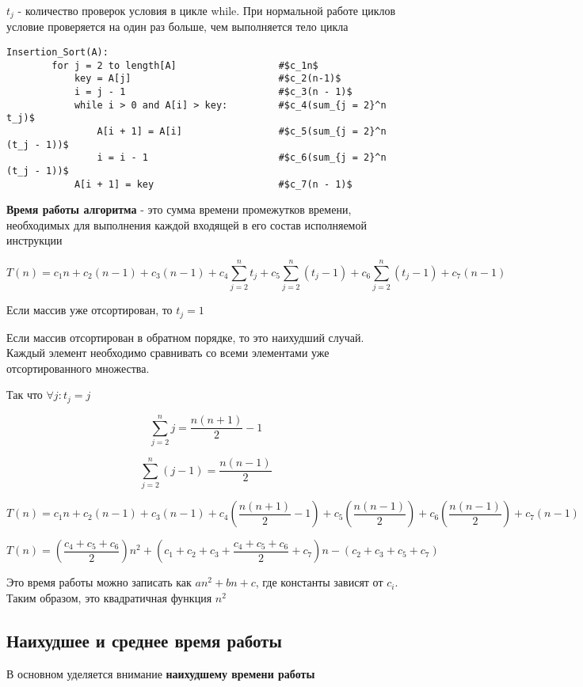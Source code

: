 \documentclass[a4paper, 12pt]{article}
\begin{document}
$t_j$ - количество проверок условия в цикле while. При нормальной работе циклов условие проверяется на один раз больше, чем 
выполняется тело цикла

\begin{lstlisting}[mathescape = true]
    Insertion_Sort(A):
        for j = 2 to length[A]                  #$c_1n$
            key = A[j]                          #$c_2(n-1)$
            i = j - 1                           #$c_3(n - 1)$
            while i > 0 and A[i] > key:         #$c_4(sum_{j = 2}^n t_j)$
                A[i + 1] = A[i]                 #$c_5(sum_{j = 2}^n (t_j - 1))$
                i = i - 1                       #$c_6(sum_{j = 2}^n (t_j - 1))$
            A[i + 1] = key                      #$c_7(n - 1)$
\end{lstlisting}

\textbf{Время работы алгоритма} - это сумма времени промежутков времени, необходимых для выполнения каждой входящей в его состав
исполняемой инструкции

\[T(n) = c_1n + c_2(n - 1) + c_3(n - 1) + c_4\sum_{j = 2}^n t_j + 
c_5 \sum_{j = 2}^n (t_j - 1) + c_6 \sum_{j = 2}^n (t_j - 1) + c_7(n - 1)\]

Если массив уже отсортирован, то $t_j = 1$

Если массив отсортирован в обратном порядке, то это наихудший случай. 
Каждый элемент необходимо сравнивать со всеми элементами уже отсортированного множества.

Так что $\forall j: t_j = j$

$$
    \sum_{j = 2}^n j = \frac{n(n + 1)}{2} - 1
$$

$$
    \sum_{j = 2}^n (j - 1) = \frac{n(n - 1)}{2}
$$

$$
    T(n) = c_1n + c_2(n - 1) + c_3(n - 1) + c_4(\frac{n(n + 1)}{2} - 1) + 
    c_5(\frac{n(n - 1)}{2}) + c_6(\frac{n(n - 1)}{2}) + c_7(n - 1)
$$

$$
    T(n) = (\frac{c_4 + c_5 + c_6}{2})n^2 + (c_1 + c_2 + c_3 + \frac{c_4 + c_5 + c_6}{2} + c_7)n - (c_2 + c_3 + c_5 + c_7)
$$

Это время работы можно записать как $an^2 + bn + c$, где константы зависят от $c_i$. Таким образом, это квадратичная функция $n^2$

\subsection{Наихудшее и среднее время работы}

В основном уделяется внимание \textbf{наихудшему времени работы}
\end{document}
